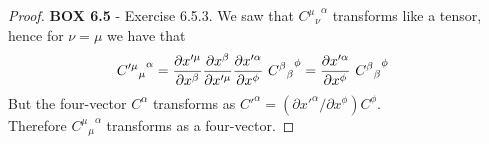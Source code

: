 \documentclass[11pt]{article}
\theoremstyle{definition}
\begin{document}
\begin{proof}{\textbf{BOX 6.5} - Exercise 6.5.3.}
    We saw that ${{C^\mu}_{\nu}}^\alpha$ transforms like a tensor, hence for
    $\nu = \mu$ we have that
    \begin{align*}
        {{C'^\mu}_{\mu}}^\alpha
        &= \partialderivative{x'^\mu}{x^\beta}
        \partialderivative{x^\beta}{x'^\mu}
        \partialderivative{x'^\alpha}{x^\phi}~
        {{C^{\beta}}_{\beta}}^\phi
        = \partialderivative{x'^\alpha}{x^\phi}~
        {{C^{\beta}}_{\beta}}^\phi
    \end{align*}
    But the four-vector $C^{\alpha}$ transforms as
    $C'^{\alpha} = (\partial x'^\alpha/\partial x^\phi) C^\phi$.\\
    Therefore ${{C^\mu}_{\mu}}^\alpha$ transforms as a four-vector.
\end{proof}
\cleardoublepage
\end{document}
